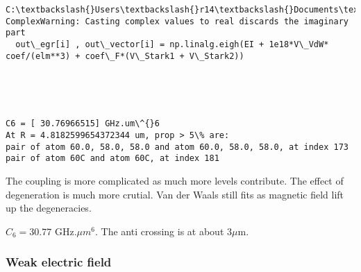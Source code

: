 \documentclass{article}
\begin{document}
    \begin{Verbatim}[commandchars=\\\{\}]
C:\textbackslash{}Users\textbackslash{}r14\textbackslash{}Documents\textbackslash{}GitHub\textbackslash{}test\textbackslash{}python\textbackslash{}cal\_VdW.py:271: ComplexWarning: Casting complex values to real discards the imaginary part
  out\_egr[i] , out\_vector[i] = np.linalg.eigh(EI + 1e18*V\_VdW* coef/(elm**3) + coef\_F*(V\_Stark1 + V\_Stark2))
    \end{Verbatim}

    \begin{center}
    \end{center}
    { \hspace*{\fill} \\}
    
    \begin{center}
    \end{center}
    { \hspace*{\fill} \\}
    
    \begin{Verbatim}[commandchars=\\\{\}]
C6 = [ 30.76966515] GHz.um\^{}6
At R = 4.8182599654372344 um, prop > 5\% are:
pair of atom 60.0, 58.0, 58.0 and atom 60.0, 58.0, 58.0, at index 173
pair of atom 60C and atom 60C, at index 181
    \end{Verbatim}

    The coupling is more complicated as much more levels contribute. The
effect of degeneration is much more crutial. Van der Waals still fits as
magnetic field lift up the degeneracies.

\(C_6 = 30.77\) GHz.\(\mu m^6\). The anti crossing is at about
\(3 \mu\)m.

\subsubsection{Weak electric field}\label{weak-electric-field}
\end{document}
